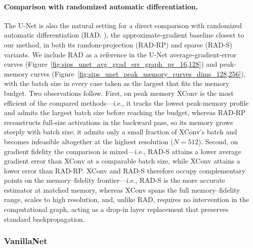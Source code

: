 \documentclass[10pt]{article}
\begin{document}
\paragraph{Comparison with randomized automatic differentiation.} The U-Net is also the natural setting for a direct comparison with randomized automatic differentiation (RAD; \citealt{oktay2020randomized}), the approximate-gradient baseline closest to our method, in both its random-projection (RAD-RP) and sparse (RAD-S) variants. We include RAD as a reference in the U-Net average-gradient-error curves (Figure~\ref{fig:sips_unet_avg_grad_err_graph_pv_16,128}) and peak-memory curves (Figure~\ref{fig:sips_unet_peak_memory_curves_dims_128,256}), with the batch size in every case taken as the largest that fits the memory budget. Two observations follow. First, on peak memory XConv is the most efficient of the compared methods---i.e., it tracks the lowest peak-memory profile and admits the largest batch size before reaching the budget, whereas RAD-RP reconstructs full-size activations in the backward pass, so its memory grows steeply with batch size; it admits only a small fraction of XConv's batch and becomes infeasible altogether at the highest resolution ($N=512$). Second, on gradient fidelity the comparison is mixed---i.e., RAD-S attains a lower average gradient error than XConv at a comparable batch size, while XConv attains a lower error than RAD-RP. XConv and RAD-S therefore occupy complementary points on the memory--fidelity frontier---i.e., RAD-S is the more accurate estimator at matched memory, whereas XConv spans the full memory--fidelity range, scales to high resolution, and, unlike RAD, requires no intervention in the computational graph, acting as a drop-in layer replacement that preserves standard backpropagation.

\subsubsection{VanillaNet}
\label{subsubsec:age_vanilla}
\end{document}
